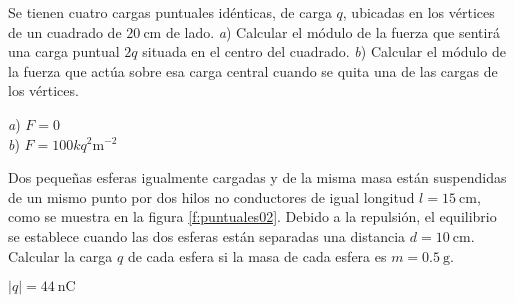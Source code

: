 %
\begin{Exercise}
  Se tienen cuatro cargas puntuales idénticas, de carga $q$, ubicadas en los vértices de un cuadrado de $\SI{20}{\centi\metre}$ de lado. \textit{a}) Calcular el módulo de la fuerza que sentirá una carga puntual $2q$ situada en el centro del cuadrado. \textit{b}) Calcular el módulo de la fuerza que actúa sobre esa carga central cuando se quita una de las cargas de los vértices.
\end{Exercise}
\begin{Answer}
  \begin{minipage}[t]{.5\textwidth}
    \textit{a}) $F = 0$\\ \textit{b}) $F = 100kq^2\si{\metre^{-2}}$
  \end{minipage}
\end{Answer}
%
\begin{Exercise}\label{p:puntuales02}
  Dos pequeñas esferas igualmente cargadas y de la misma masa están suspendidas de un mismo punto por dos hilos no conductores de igual longitud $l = \SI{15}{\centi\metre}$, como se muestra en la figura \ref{f:puntuales02}. Debido a la repulsión, el equilibrio se establece cuando las dos esferas están separadas una distancia $d = \SI{10}{\centi\metre}$. Calcular la carga $q$ de cada esfera si la masa de cada esfera es $m = \SI{0.5}{\gram}$.
\end{Exercise}
\begin{Answer}
  $|q| = \SI{44}{\nano\coulomb}$
\end{Answer}
%
\begin{center}
\end{center}
